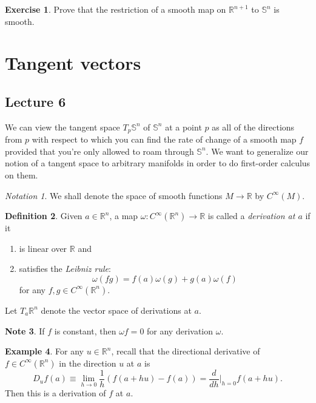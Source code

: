 \documentclass[10pt,letterpaper,cm]{nupset}
\theoremstyle{definition}
\newtheorem{definition}{Definition}[subsection]
\newtheorem{exmp}[definition]{Example}
\newtheorem{note}[definition]{Note}
\theoremstyle{theorem}
\newtheorem{exercise}[definition]{Exercise}
\theoremstyle{remark}
\newtheorem*{notation}{Notation}
\newcommand{\R}{\mathbb R}
\renewcommand{\S}{\mathbb S}
\newcommand{\1}{\mathbf{1}}
\newcommand{\0}{\vec 0}
\begin{document}
\begin{exercise}
Prove that the restriction of a smooth map on $\R^{n+1}$ to $\S^n$ is smooth. 
\end{exercise}

\section{Tangent vectors}

\subsection{Lecture 6}


We can view the tangent space $T_p{\S^n}$ of $\S^n$ at a point $p$ as all of the directions from $p$ with respect to which you can find the rate of change of a smooth map $f$ provided that you're only allowed to roam through $\S^n$. We want to generalize our notion of a tangent space to arbitrary manifolds in order to do first-order calculus on them.

\begin{notation}
We shall denote the space of smooth functions $M \to \R$ by $C^{\infty}(M)$.
\end{notation}

\begin{definition}
Given $a \in \R^n$, a map $\omega: C^{\infty}(\R^n) \to \R$ is called a \textit{derivation at $a$} if it
\begin{enumerate}[label=(\roman*)]
\item is linear over $\R$ and 
\item satisfies the \textit{Leibniz rule}:
$$\omega(fg) = f(a)\omega(g) + g(a) \omega(f)$$ for any $f, g \in C^{\infty}(\R^n).$
\end{enumerate}
Let $T_a{\R^n}$ denote the vector space of derivations at $a$.
\end{definition}

\begin{note}
If $f$ is constant, then $\omega f =0$ for any derivation $\omega$.
\end{note}

\begin{exmp}
For any $u \in \R^n$, recall that the directional derivative of $f\in C^{\infty}(\R^n)$ in the direction $u$ at $a$ is $$D_uf(a) \equiv \lim_{h \to 0} \frac{1}{h}(f(a+hu) -f(a)) = \frac{d}{d{h}}\bigr\rvert_{h=0} f(a+hu).$$ Then this is a derivation of $f$ at $a$. 
\end{exmp}
\end{document}

